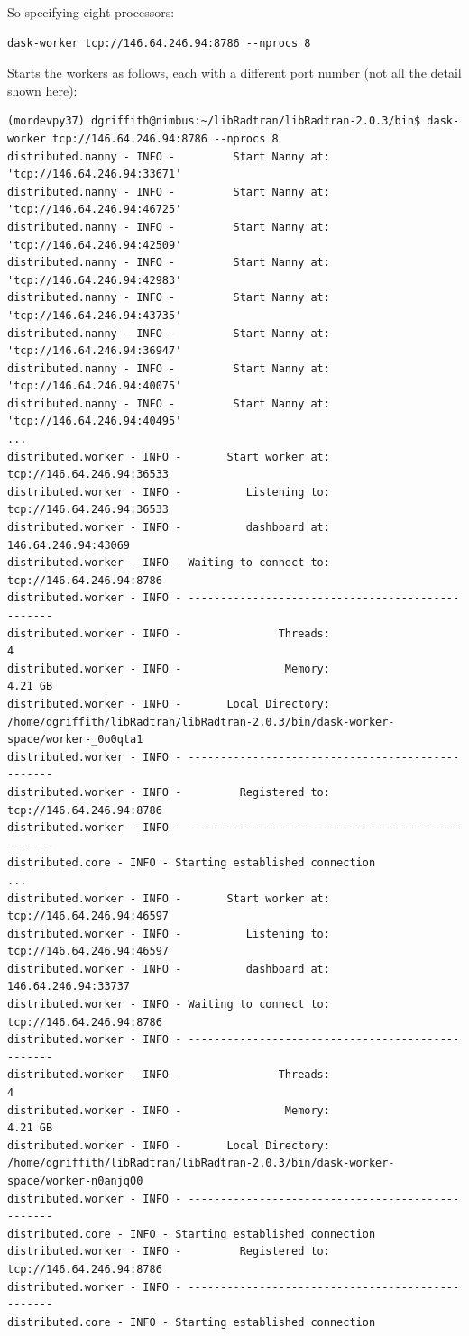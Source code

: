 \begin{enumerate}
So specifying eight processors:
\begin{lstlisting}
dask-worker tcp://146.64.246.94:8786 --nprocs 8
\end{lstlisting}
Starts the workers as follows, each with a different port number (not all the detail shown here):

\begin{lstlisting}
(mordevpy37) dgriffith@nimbus:~/libRadtran/libRadtran-2.0.3/bin$ dask-worker tcp://146.64.246.94:8786 --nprocs 8
distributed.nanny - INFO -         Start Nanny at: 'tcp://146.64.246.94:33671'
distributed.nanny - INFO -         Start Nanny at: 'tcp://146.64.246.94:46725'
distributed.nanny - INFO -         Start Nanny at: 'tcp://146.64.246.94:42509'
distributed.nanny - INFO -         Start Nanny at: 'tcp://146.64.246.94:42983'
distributed.nanny - INFO -         Start Nanny at: 'tcp://146.64.246.94:43735'
distributed.nanny - INFO -         Start Nanny at: 'tcp://146.64.246.94:36947'
distributed.nanny - INFO -         Start Nanny at: 'tcp://146.64.246.94:40075'
distributed.nanny - INFO -         Start Nanny at: 'tcp://146.64.246.94:40495'
...
distributed.worker - INFO -       Start worker at:  tcp://146.64.246.94:36533
distributed.worker - INFO -          Listening to:  tcp://146.64.246.94:36533
distributed.worker - INFO -          dashboard at:        146.64.246.94:43069
distributed.worker - INFO - Waiting to connect to:   tcp://146.64.246.94:8786
distributed.worker - INFO - -------------------------------------------------
distributed.worker - INFO -               Threads:                          4
distributed.worker - INFO -                Memory:                    4.21 GB
distributed.worker - INFO -       Local Directory: /home/dgriffith/libRadtran/libRadtran-2.0.3/bin/dask-worker-space/worker-_0o0qta1
distributed.worker - INFO - -------------------------------------------------
distributed.worker - INFO -         Registered to:   tcp://146.64.246.94:8786
distributed.worker - INFO - -------------------------------------------------
distributed.core - INFO - Starting established connection
...
distributed.worker - INFO -       Start worker at:  tcp://146.64.246.94:46597
distributed.worker - INFO -          Listening to:  tcp://146.64.246.94:46597
distributed.worker - INFO -          dashboard at:        146.64.246.94:33737
distributed.worker - INFO - Waiting to connect to:   tcp://146.64.246.94:8786
distributed.worker - INFO - -------------------------------------------------
distributed.worker - INFO -               Threads:                          4
distributed.worker - INFO -                Memory:                    4.21 GB
distributed.worker - INFO -       Local Directory: /home/dgriffith/libRadtran/libRadtran-2.0.3/bin/dask-worker-space/worker-n0anjq00
distributed.worker - INFO - -------------------------------------------------
distributed.core - INFO - Starting established connection
distributed.worker - INFO -         Registered to:   tcp://146.64.246.94:8786
distributed.worker - INFO - -------------------------------------------------
distributed.core - INFO - Starting established connection
\end{lstlisting}



\end{enumerate}
